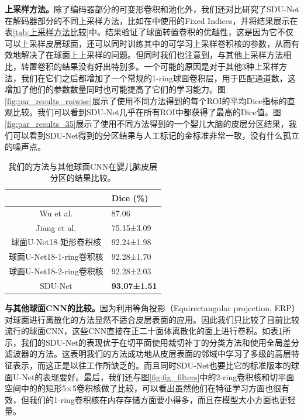 \textbf{上采样方法。}除了编码器部分的可变形卷积和池化外，我们还对比研究了SDU-Net在解码器部分的不同上采样方法，比如在\cite{jiang2018spherical,parvathaneni2019cortical}中使用的Fixed Indices，并将结果展示在表\ref{tab:上采样方法比较}中。结果验证了球面转置卷积的优越性，这是因为它不仅可以上采样皮层球面，还可以同时训练其中的可学习上采样卷积核的参数，从而有效地解决了在球面上上采样的问题。但同时我们也注意到，与其他上采样方法相比，转置卷积的结果没有好出特别多。一个可能的原因是对于其他3种上采样方法，我们在它们之后都增加了一个常规的1-ring球面卷积层，用于匹配通道数，这增加了他们的参数数量同时也可能提高了它们的学习能力。图\ref{fig:par_results_roiwise}展示了使用不同方法得到的每个ROI的平均Dice指标的直观比较。我们可以看到SDU-Net几乎在所有ROI中都获得了最高的Dice值。图\ref{fig:par_results_35}展示了使用不同方法得到的一个婴儿大脑的皮层分区结果，我们可以看到SDU-Net得到的分区结果与人工标记的金标准非常一致，没有什么孤立的噪声点。


\begin{table}[t]
		\caption{我们的方法与其他球面CNN在婴儿脑皮层分区的结果比较。}
		\label{tab:与其他球面CNNs的比较}
		\centering
		\begin{tabularx}{0.8\linewidth}{c | X<{\centering}}
			\hline
			& Dice (\%)        \\
			\hline
			Wu et al. \cite{wu2018registration}										&   87.06\\
			Jiang et al. \cite{jiang2018spherical, parvathaneni2019cortical}		& 	75.15±3.09		\\
			球面U-Net18-矩形卷积核\cite{seong2018geometric,zhao2018distortion,tateno2018distortion}	& 	92.24±1.98\\
			球面U-Net18-1-ring卷积核 			&   92.28±1.70\\
			球面U-Net18-2-ring卷积核 				    &   92.28±2.03\\
			SDU-Net  											&	\textbf{93.07±1.51} \\
			\hline 
		\end{tabularx}
\end{table}

\textbf{与其他球面CNN的比较。}因为利用等角投影（Equirectangular projection, ERP）对球面进行离散化的方法\cite{s2018spherical,hu2017deep,esteves2018learning}显然不适合皮层表面的应用。因此我们只比较了目前比较流行的球面CNN\cite{wu2018registration,jiang2018spherical,seong2018geometric}，这些CNN直接在正二十面体离散化的面上进行卷积。如表\ref{tab:与其他球面CNNs的比较}所示，我们的SDU-Net的表现优于在切平面使用裁切补丁的分类方法\cite{wu2018registration}和使用全局差分滤波器的方法\cite{jiang2018spherical}。这表明我们的方法成功地从皮层表面的邻域中学习了多级的高层特征表示，而这正是以往工作\cite{wu2018registration,jiang2018spherical}所缺乏的。而且同时SDU-Net也要比它的标准版本的球面U-Net\cite{zhao2019spherical_ipmi}的表现要好。最后，我们还与图\ref{fig:fig_filters}中的2-ring卷积核和切平面空间中的的矩形5$\times$5卷积核做了比较，可以看出虽然他们在特征学习方面也很有效，但我们的1-ring卷积核在内存存储方面要小得多，而且在模型大小方面也更轻量。


